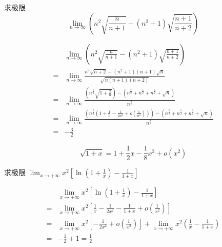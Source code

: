 \documentclass[color=green,titlestyle=hang]{elegantbook}%
\begin{document}
\begin{exercise}
求极限\begin{equation*}\lim_{n \to \infty } \left( {{n^2}\sqrt {\frac{n}{{n + 1}}}  - \left( {{n^2} + 1} \right)\sqrt {\frac{{n + 1}}{{n + 2}}} } \right)\end{equation*}
\end{exercise}\begin{solution}
\begin{align*}
&\lim_{n \to \infty } \left( {{n^2}\sqrt {\frac{n}{{n+1}}}-\left( {{n^2}+1}\right)\sqrt {\frac{{n+1}}{{n+2}}} }\right)\\
=&\lim_{n \to \infty } \frac{{{n^3}\sqrt {n + 2}  - \left( {{n^2} + 1} \right)\left( {n + 1} \right)\sqrt n }}{{\sqrt {n\left( {n + 1} \right)\left( {n + 2} \right)} }}\\
= &\lim_{n \to \infty } \frac{{\left( {{n^{\frac{7}{2}}}\sqrt {1 + \frac{2}{n}} } \right) - \left( {{n^{\frac{7}{2}}} + {n^{\frac{5}{2}}} + {n^{\frac{3}{2}}} + \sqrt n } \right)}}{{{n^{\frac{3}{2}}}}}\\
= &\lim_{n \to \infty } \frac{{\left( {{n^{\frac{7}{2}}}\left( {1 + \frac{1}{n} - \frac{1}{{2{n^2}}} + o\left( {\frac{1}{{{n^2}}}} \right)} \right)} \right)-\left({{n^{\frac{7}{2}}} + {n^{\frac{5}{2}}} + {n^{\frac{3}{2}}} + \sqrt n}\right)}}{{{n^{\frac{3}{2}}}}}\\
= & - \frac{3}{2}\end{align*}
\begin{note}
	\[\sqrt {1 + x}  = 1 + \frac{1}{2}x - \frac{1}{8}{x^2} + o\left( {{x^2}} \right)\]
\end{note}	
\end{solution}

\begin{example}
求极限 $\lim_{x\to+\infty}x^2\left[\ln\left(1+\frac{1}{x}\right)-\frac{1}{1+x}\right]$
\end{example}\begin{solution}
\begin{align*}
&\lim_{x\to+\infty}x^2\left[\ln\left(1+\frac{1}{x}\right)-\frac{1}{1+x}\right]\\
=&\lim_{x\to+\infty}x^2\left[\frac{1}{x}-\frac{1}{2x^2}-\frac{1}{1+x}+o\left(\frac{1}{x^2}\right)\right]\\
=&\lim_{x\to+\infty}x^2\left[-\frac{1}{2x^2}+o\left(\frac{1}{x^2}\right)\right]+\lim_{x\to+\infty}x^2\left(\frac{1}{x}-\frac{1}{1+x}\right)\\
=&-\frac{1}{2}+1=\frac{1}{2}
\end{align*}
\end{solution}
\end{document}
